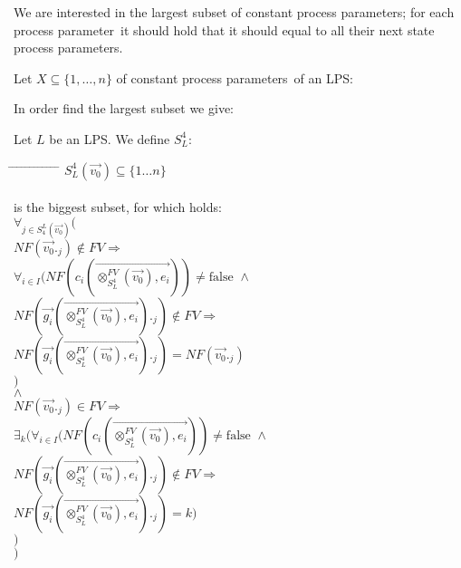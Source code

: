 \index{}\documentclass[a4paper,10pt]{article}
\theoremstyle{plain}
\theoremstyle{definition}
\newcommand{\ovr}{\overrightarrow}
\newcommand{\pp}{process parameter}
\newcommand{\pps}{process parameters}
\newcommand{\tab}{\hspace*{5.mm} \= \hspace*{5.mm} \= \hspace*{5.mm} \= \hspace*{5.mm} \= \hspace*{5.mm} \= \hspace*{5.mm}  \= \hspace*{5.mm}  \= \hspace*{5.mm}  \= \hspace*{5.mm} \= \hspace*{5.mm} \= \hspace*{5.mm}  \= \hspace*{5.mm}  \= \hspace*{5.mm}\kill}
\begin{document}
We are interested in the largest subset of constant \pps ; for each \pp\ it should hold that it should equal to all their next state \pps.

Let $X \subseteq \lbrace 1, \ldots, n \rbrace$ of constant \pps\ of an LPS:


\newcommand{\z}{(\ovr{\otimes_{S_L^4}^{FV}(\ovr{v_0}),e_i})}

\noindent In order find the largest subset we give: %
\begin{defn} \label{def:sug4} Let $L$ be an LPS. We define $S_L^4$:
\begin{tabbing}
\tab
$ S_L^4(\ovr{v_0}) \subseteq \lbrace 1 \ldots n  \rbrace $ \\ \\
is the biggest subset, for which holds:\\
\> $\forall_{j \in S^L_4(\ovr{v_0})}($\\
\> \>$NF(\ovr{v_0}._j) \not\in FV \Rightarrow $\\
\> \>$\forall_{i \in I} (NF(c_i\z) \neq \text{false } \wedge$ \\
\> \>$NF(\ovr{g_i}\z._j) \not\in FV \Rightarrow$\\
\> \> \> $NF(\ovr{g_i}\z._j)= NF(\ovr{v_0}._j)$\\
 \> \> $)$\\
\> $\land$\\
\> \> $NF(\ovr{v_0}._j) \in FV \Rightarrow$ \\
\> \>$ \exists_k(\forall_{i \in I} (NF(c_i\z) \neq \text{false } \wedge $\\
\> \>$ NF(\ovr{g_i}\z._j) \not\in FV \Rightarrow $ \\
\> \> \> $ NF(\ovr{g_i}\z._j)= k)$\\
\> \> $)$\\ 
\> $)$\\
\end{tabbing}
\end{defn}
\end{document}
